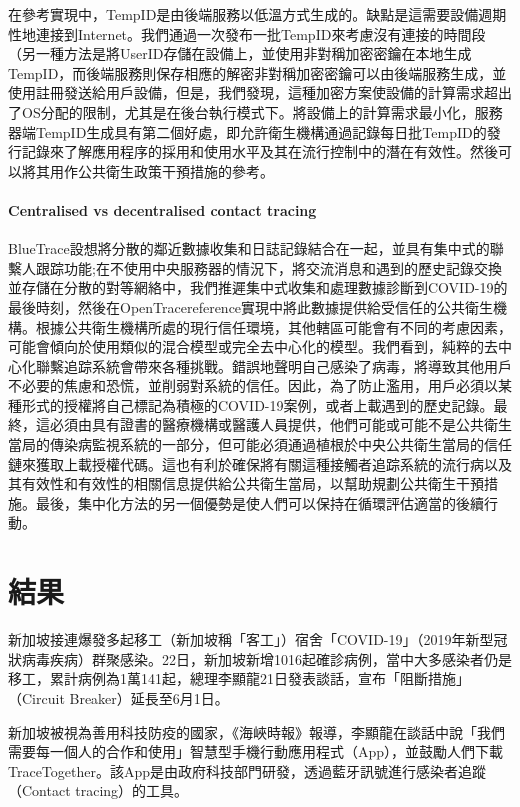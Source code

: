 \documentclass[12pt, a4paper]{report}
\begin{document}
在參考實現中，TempID是由後端服務以低溫方式生成的。缺點是這需要設備週期性地連接到Internet。我們通過一次發布一批TempID來考慮沒有連接的時間段（另一種方法是將UserID存儲在設備上，並使用非對稱加密密鑰在本地生成TempID，而後端服務則保存相應的解密非對稱加密密鑰可以由後端服務生成，並使用註冊發送給用戶設備，但是，我們發現，這種加密方案使設備的計算需求超出了OS分配的限制，尤其是在後台執行模式下。將設備上的計算需求最小化，服務器端TempID生成具有第二個好處，即允許衛生機構通過記錄每日批TempID的發行記錄來了解應用程序的採用和使用水平及其在流行控制中的潛在有效性。然後可以將其用作公共衛生政策干預措施的參考。 

\subsection{Centralised vs decentralised contact tracing}

BlueTrace設想將分散的鄰近數據收集和日誌記錄結合在一起，並具有集中式的聯繫人跟踪功能;在不使用中央服務器的情況下，將交流消息和遇到的歷史記錄交換並存儲在分散的對等網絡中，我們推遲集中式收集和處理數據診斷到COVID-19的最後時刻，然後在OpenTracereference實現中將此數據提供給受信任的公共衛生機構。根據公共衛生機構所處的現行信任環境，其他轄區可能會有不同的考慮因素，可能會傾向於使用類似的混合模型或完全去中心化的模型。我們看到，純粹的去中心化聯繫追踪系統會帶來各種挑戰。錯誤地聲明自己感染了病毒，將導致其他用戶不必要的焦慮和恐慌，並削弱對系統的信任。因此，為了防止濫用，用戶必須以某種形式的授權將自己標記為積極的COVID-19案例，或者上載遇到的歷史記錄。最終，這必須由具有證書的醫療機構或醫護人員提供，他們可能或可能不是公共衛生當局的傳染病監視系統的一部分，但可能必須通過植根於中央公共衛生當局的信任鏈來獲取上載授權代碼。這也有利於確保將有關這種接觸者追踪系統的流行病以及其有效性和有效性的相關信息提供給公共衛生當局，以幫助規劃公共衛生干預措施。最後，集中化方法的另一個優勢是使人們可以保持在循環評估適當的後續行動。

\part{結果}

新加坡接連爆發多起移工（新加坡稱「客工」）宿舍「COVID-19」（2019年新型冠狀病毒疾病）群聚感染。22日，新加坡新增1016起確診病例，當中大多感染者仍是移工，累計病例為1萬141起，總理李顯龍21日發表談話，宣布「阻斷措施」（Circuit Breaker）延長至6月1日。

新加坡被視為善用科技防疫的國家，《海峽時報》報導，李顯龍在談話中說「我們需要每一個人的合作和使用」智慧型手機行動應用程式（App），並鼓勵人們下載TraceTogether。該App是由政府科技部門研發，透過藍牙訊號進行感染者追蹤（Contact tracing）的工具。
\end{document}
